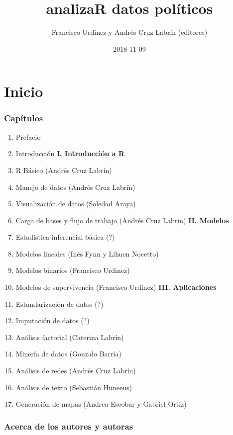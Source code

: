 \documentclass[]{book}
\title{analizaR datos políticos}
\author{Francisco Urdinez y Andrés Cruz Labrín (editores)}
\date{2018-11-09}
\providecommand{\tightlist}{%
  \setlength{\itemsep}{0pt}\setlength{\parskip}{0pt}}
\begin{document}
\maketitle

{
\setcounter{tocdepth}{1}
\tableofcontents
}
\hypertarget{inicio}{%
\chapter*{Inicio}\label{inicio}}

\hypertarget{capitulos}{%
\subsection*{Capítulos}\label{capitulos}}

\begin{enumerate}
\def\labelenumi{\arabic{enumi}.}
\tightlist
\item
  Prefacio
\item
  Introducción \textbf{I. Introducción a R}
\item
  R Básico (Andrés Cruz Labrín)
\item
  Manejo de datos (Andrés Cruz Labrín)
\item
  Visualización de datos (Soledad Araya)
\item
  Carga de bases y flujo de trabajo (Andrés Cruz Labrín) \textbf{II.
  Modelos}
\item
  Estadística inferencial básica (?)
\item
  Modelos lineales (Inés Fynn y Lihuen Nocetto)
\item
  Modelos binarios (Francisco Urdinez)
\item
  Modelos de supervivencia (Francisco Urdinez) \textbf{III.
  Aplicaciones}
\item
  Estandarización de datos (?)
\item
  Imputación de datos (?)
\item
  Análisis factorial (Caterina Labrín)
\item
  Minería de datos (Gonzalo Barría)
\item
  Análisis de redes (Andrés Cruz Labrín)
\item
  Análisis de texto (Sebastián Huneeus)
\item
  Generación de mapas (Andrea Escobar y Gabriel Ortiz)
\end{enumerate}

\hypertarget{acerca-de-los-autores-y-autoras}{%
\subsection*{Acerca de los autores y
autoras}\label{acerca-de-los-autores-y-autoras}}
\end{document}
